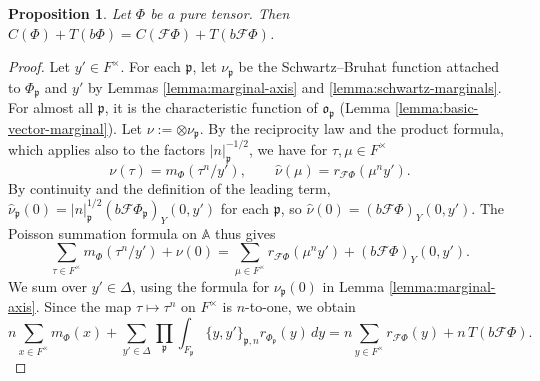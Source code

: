 \documentclass[reqno]{amsart}
\theoremstyle{plain}
\newtheorem{proposition}[theorem]{Proposition}
\theoremstyle{definition}
\theoremstyle{itplain}
\numberwithin{equation}{section}
\numberwithin{theorem}{section}
\begin{document}
\begin{proposition}\label{proposition:constant-terms}
  Let $\Phi$ be a pure tensor.  Then $C(\Phi) + T(b \Phi) = C(\mathcal{F} \Phi) + T(b \mathcal{F} \Phi)$.
\end{proposition}
\begin{proof}
  Let $y' \in F^\times$.  For each $\mathfrak{p}$, let $\nu_{\mathfrak{p}}$ be the Schwartz--Bruhat function attached to $\Phi_{\mathfrak{p}}$ and $y'$ by Lemmas \ref{lemma:marginal-axis} and \ref{lemma:schwartz-marginals}.  For almost all $\mathfrak{p}$, it is the characteristic function of $\mathfrak{o}_{\mathfrak{p}}$ (Lemma \ref{lemma:basic-vector-marginal}).  Let $\nu := \otimes \nu_{\mathfrak{p}}$.  By the reciprocity law and the product formula, which applies also to the factors $\lvert n \rvert_{\mathfrak{p}}^{-1/2}$, we have for $\tau, \mu \in F^\times$
  \begin{equation*}
    \nu(\tau) = m_\Phi(\tau^n / y'),
    \qquad
    \hat{\nu}(\mu) = r_{\mathcal{F} \Phi}(\mu^n y').
  \end{equation*}
  By continuity and the definition of the leading term, $\hat{\nu}_{\mathfrak{p}}(0) = \lvert n \rvert_{\mathfrak{p}}^{1/2} (b \mathcal{F} \Phi_{\mathfrak{p}})_Y(0, y')$ for each $\mathfrak{p}$, so $\hat{\nu}(0) = (b \mathcal{F} \Phi)_Y(0, y')$.  The Poisson summation formula on $\mathbb{A}$ thus gives
  \begin{equation*}
    \sum_{\tau \in F^\times} m_\Phi(\tau^n / y') + \nu(0) = \sum_{\mu \in F^\times} r_{\mathcal{F} \Phi}(\mu^n y') + (b \mathcal{F} \Phi)_Y(0, y').
  \end{equation*}
  We sum over $y' \in \Delta$, using the formula for $\nu_{\mathfrak{p}}(0)$ in Lemma \ref{lemma:marginal-axis}.  Since the map $\tau \mapsto \tau^n$ on $F^\times$ is $n$-to-one, we obtain
  \begin{equation}\label{eq:constant-terms-1}
    n \sum_{x \in F^\times} m_\Phi(x)
    + \sum_{y' \in \Delta} \prod_{\mathfrak{p}} \int_{F_{\mathfrak{p}}} \{y, y'\}_{\mathfrak{p}, n} r_{\Phi_{\mathfrak{p}}}(y) \, d y
    = n \sum_{y \in F^\times} r_{\mathcal{F} \Phi}(y) + n \, T(b \mathcal{F} \Phi).
  \end{equation}


\end{proof}
\end{document}
